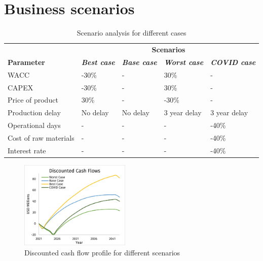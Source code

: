 
\section{Business scenarios}

\begin{table}[H]
\centering
\caption{Scenario analysis for different cases}
\label{scenario_analysis}
\begin{tabular}{l|llll}
\toprule
                      & \multicolumn{4}{c}{\textbf{Scenarios}}                                                        \\
\textbf{Parameter}    & \textit{\textbf{Best case}} & \textit{\textbf{Base case}} & \textit{\textbf{Worst case}} & \textit{\textbf{COVID case}} \\ \midrule
WACC                  & -30\%                       & -                          & 30\%                         & -                            \\
CAPEX                 & -30\%                       & -                          & 30\%                         & -                            \\
Price of product      & 30\%                        & -                          & -30\%                        & -                            \\
Production delay      & No delay                    & No delay                   & 3 year delay                 & 3 year delay                 \\
Operational days      & -                           & -                          & -                            & -40\%                        \\
Cost of raw materials & -                           & -                          & -                            & -40\%                        \\
Interest rate         & -                           & -                          & -                            & -40\%                        \\\bottomrule
\end{tabular}
\end{table}

\begin{figure}
    \caption{Discounted cash flow profile for different scenarios}
    \label{DCF_scenario}
    \includegraphics[width=0.47\textwidth]{chapters/6-economics/figures/DCF.jpg}
\end{figure}

